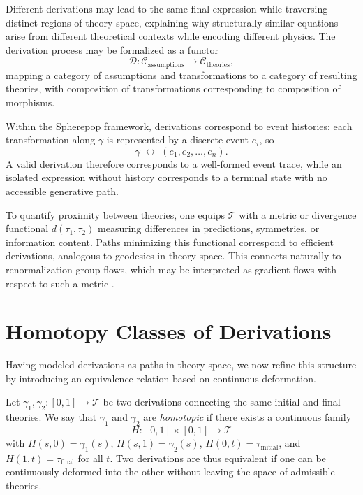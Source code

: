 \documentclass[12pt,a4paper]{article}
\theoremstyle{plain}
\theoremstyle{definition}
\theoremstyle{remark}
\begin{document}
Different derivations may lead to the same final expression while
traversing distinct regions of theory space, explaining why
structurally similar equations arise from different theoretical contexts
while encoding different physics. The derivation process may be
formalized as a functor
\begin{equation}
\mathcal{D} : \mathcal{C}_{\mathrm{assumptions}}
\rightarrow \mathcal{C}_{\mathrm{theories}},
\end{equation}
mapping a category of assumptions and transformations to a category of
resulting theories, with composition of transformations corresponding
to composition of morphisms.

Within the Spherepop framework, derivations correspond to event
histories: each transformation along $\gamma$ is represented by a
discrete event $e_i$, so
\begin{equation}
\gamma \;\longleftrightarrow\; (e_1, e_2, \ldots, e_n).
\end{equation}
A valid derivation therefore corresponds to a well-formed event trace,
while an isolated expression without history corresponds to a terminal
state with no accessible generative path.

To quantify proximity between theories, one equips $\mathcal{T}$ with
a metric or divergence functional $d(\tau_1,\tau_2)$ measuring
differences in predictions, symmetries, or information content. Paths
minimizing this functional correspond to efficient derivations,
analogous to geodesics in theory space. This connects naturally to
renormalization group flows, which may be interpreted as gradient flows
with respect to such a metric \cite{Zamolodchikov1986,PannellStergiou2025}.

\section{Homotopy Classes of Derivations}
\label{sec:homotopy}

Having modeled derivations as paths in theory space, we now refine this
structure by introducing an equivalence relation based on continuous
deformation.

Let $\gamma_1, \gamma_2 : [0,1] \to \mathcal{T}$ be two derivations
connecting the same initial and final theories. We say that $\gamma_1$
and $\gamma_2$ are \emph{homotopic} if there exists a continuous family
\begin{equation}
H : [0,1]\times[0,1] \to \mathcal{T}
\end{equation}
with $H(s,0) = \gamma_1(s)$, $H(s,1) = \gamma_2(s)$,
$H(0,t) = \tau_{\mathrm{initial}}$, and $H(1,t) = \tau_{\mathrm{final}}$
for all $t$. Two derivations are thus equivalent if one can be
continuously deformed into the other without leaving the space of
admissible theories.
\end{document}
